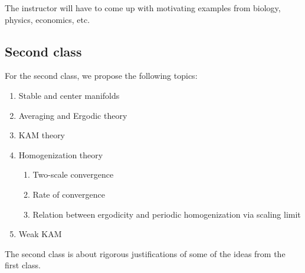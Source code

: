 \documentclass[12pt]{amsart}
\begin{document}
The instructor will have to come up with motivating examples from biology, physics,
economics, etc.

\subsection*{Second class}
For the second class, we propose the following topics:
\begin{enumerate}
    \item Stable and center manifolds
    \item Averaging and Ergodic theory
    \item KAM theory
    \item Homogenization theory
        \begin{enumerate}
            \item Two-scale convergence
            \item Rate of convergence
            \item Relation between ergodicity and periodic homogenization via scaling limit
        \end{enumerate}
    \item Weak KAM
\end{enumerate}
The second class is about rigorous justifications of some of the ideas from
the first class.



\printbibliography 
%
%
\end{document}

